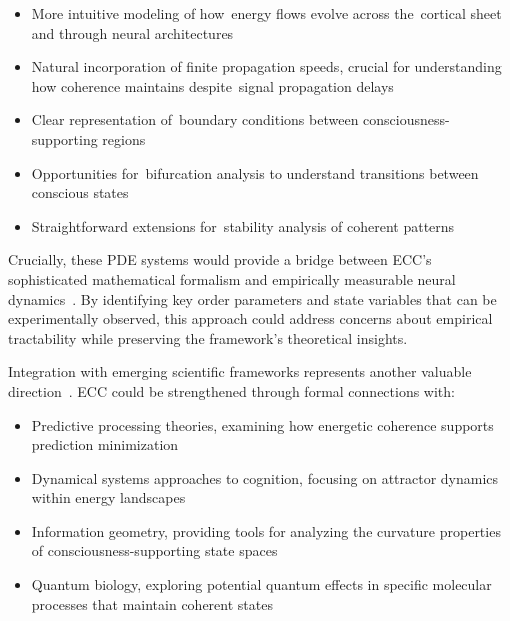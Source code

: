 \begin{itemize}
    \item More intuitive modeling of how~energy flows evolve across the~cortical sheet and through neural architectures
    \item Natural incorporation of finite propagation speeds, crucial for understanding how coherence maintains despite~signal propagation delays
    \item Clear representation of~boundary conditions between consciousness-supporting regions
    \item Opportunities for~bifurcation analysis to understand transitions between conscious states
    \item Straightforward extensions for~stability analysis of coherent patterns
\end{itemize}

Crucially, these PDE systems would provide a bridge between ECC's sophisticated mathematical formalism and empirically measurable neural dynamics~\cite{seth2021being, bosl2025dynamical}. By identifying key order parameters and state variables that can be experimentally observed, this approach could address concerns about empirical tractability while preserving the framework's theoretical insights.

Integration with emerging scientific frameworks represents another valuable direction~\cite{feinberg2016ancient, kauffman2019world}. ECC could be strengthened through formal connections with:

\begin{itemize}
    \item Predictive processing theories, examining how energetic coherence supports prediction minimization~\cite{seth2021being, clark2013whatever}
    \item Dynamical systems approaches to cognition, focusing on attractor dynamics within energy landscapes~\cite{kelso2016dynamic}
    \item Information geometry, providing tools for analyzing the curvature properties of consciousness-supporting state spaces
    \item Quantum biology, exploring potential quantum effects in specific molecular processes that maintain coherent states~\cite{hameroff2014consciousness}
\end{itemize}

